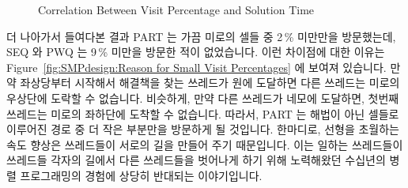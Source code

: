\begin{figure}[tb]
\centering
{}
\caption{Correlation Between Visit Percentage and Solution Time}
\label{fig:SMPdesign:Correlation Between Visit Percentage and Solution Time}
\end{figure}

더 나아가서 들여다본 결과 PART 는 가끔 미로의 셀들 중 2\,\% 미만만을 방문했는데,
SEQ 와 PWQ 는 9\,\% 미만을 방문한 적이 없었습니다.
이런 차이점에 대한 이유는
Figure~\ref{fig:SMPdesign:Reason for Small Visit Percentages} 에 보여져
있습니다.
만약 좌상당부터 시작해서 해결책을 찾는 쓰레드가 원에 도달하면 다른 쓰레드는
미로의 우상단에 도락할 수 없습니다.
비슷하게, 만약 다른 쓰레드가 네모에 도달하면, 첫번째 쓰레드는 미로의 좌하단에
도착할 수 없습니다.
따라서, PART 는 해법이 아닌 셀들로 이루어진 경로 중 더 작은 부분만을 방문하게
될 것입니다.
한마디로, 선형을 초월하는 속도 향상은 쓰레드들이 서로의 길을 만들어 주기
때문입니다.
이는 일하는 쓰레드들이 쓰레드들 각자의 길에서 다른 쓰레드들을 벗어나게 하기
위해 노력해왔던 수십년의 병렬 프로그래밍의 경험에 상당히 반대되는 이야기입니다.

